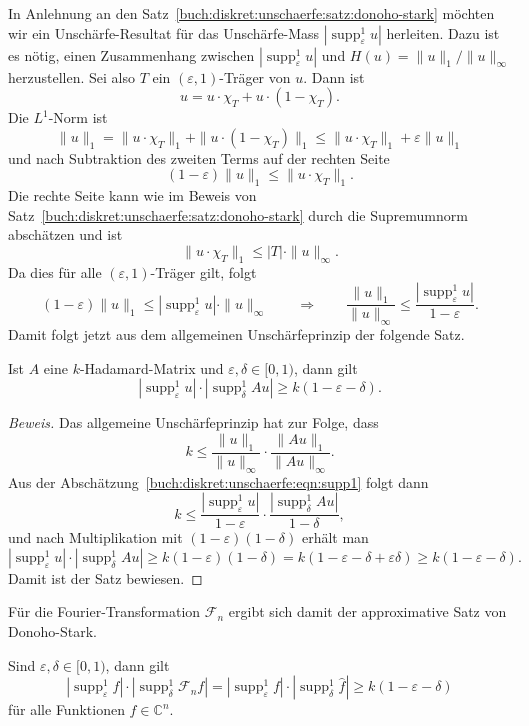 In Anlehnung an den Satz~\ref{buch:diskret:unschaerfe:satz:donoho-stark}
möchten wir ein Unschärfe-Resultat für das Unschärfe-Mass
$|\operatorname{supp}_\varepsilon^1 u|$ herleiten.
Dazu ist es nötig, einen Zusammenhang zwischen
$|\operatorname{supp}_\varepsilon^1 u|$ und $H(u) = \|u\|_1/\|u\|_\infty$ 
herzustellen.
Sei also $T$ ein $(\varepsilon,1)$-Träger von $u$.
Dann ist
\[
u = u\cdot \chi_T + u\cdot (1-\chi_T).
\]
Die $L^1$-Norm ist
\[
\|u\|_1
=
\|u\cdot \chi_T\|_1
+
\|u\cdot (1-\chi_T)\|_1
\le
\|u\cdot \chi_T\|_1
+
\varepsilon \|u\|_1
\]
und nach Subtraktion des zweiten Terms auf der rechten Seite
\[
(1-\varepsilon)\|u\|_1 \le \|u\cdot\chi_T\|_1.
\]
Die rechte Seite kann wie im Beweis von
Satz~\ref{buch:diskret:unschaerfe:satz:donoho-stark}
durch die Supremumnorm abschätzen und ist
\[
\|u\cdot \chi_T\|_1 \le |T| \cdot \|u\|_\infty.
\]
Da dies für alle $(\varepsilon,1)$-Träger gilt, folgt
\begin{equation}
(1-\varepsilon) \|u\|_1
\le
|\operatorname{supp}_\varepsilon^1 u|\cdot \|u\|_\infty
\qquad
\Rightarrow
\qquad
\frac{\|u\|_1}{\|u\|_\infty}
\le
\frac{|\operatorname{supp}_\varepsilon^1 u|}{1-\varepsilon}.
\label{buch:diskret:unschaerfe:eqn:supp1}
\end{equation}
Damit folgt jetzt aus dem allgemeinen Unschärfeprinzip der folgende
Satz.

\begin{satz}
%
Ist $A$ eine $k$-Hadamard-Matrix und $\varepsilon,\delta\in [0,1)$,
dann gilt
\[
|\operatorname{supp}_\varepsilon^1 u|
\cdot
|\operatorname{supp}_\delta^1 Au|
\ge 
k(1-\varepsilon-\delta).
\]
\end{satz}

\begin{proof}[Beweis]
Das allgemeine Unschärfeprinzip hat zur Folge, dass
\[
k
\le
\frac{\|u\|_1}{\|u\|_\infty}
\cdot
\frac{\|Au\|_1}{\|Au\|_\infty}.
\]
Aus der Abschätzung~\eqref{buch:diskret:unschaerfe:eqn:supp1}
folgt dann
\[
k
\le
\frac{ |\operatorname{supp}_\varepsilon^1 u| }{ 1-\varepsilon }
\cdot
\frac{ |\operatorname{supp}_\delta^1 Au| }{ 1-\delta },
\]
und nach Multiplikation mit $(1-\varepsilon)(1-\delta)$ erhält man
\[
|\operatorname{supp}_\varepsilon^1 u|
\cdot
|\operatorname{supp}_\delta^1 Au|
\ge
k(1-\varepsilon)(1-\delta)
=
k(1-\varepsilon-\delta+\varepsilon\delta)
\ge
k(1-\varepsilon-\delta).
\]
Damit ist der Satz bewiesen.
\end{proof}

Für die Fourier-Transformation $\mathscr{F}_n$ ergibt sich damit 
der approximative Satz von Donoho-Stark.

\begin{satz}
Sind $\varepsilon,\delta\in[0,1)$, dann gilt
\[
|\operatorname{supp}_\varepsilon^1 f|
\cdot
|\operatorname{supp}_\delta^1 \mathscr{F}_nf|
=
|\operatorname{supp}_\varepsilon^1 f|
\cdot
|\operatorname{supp}_\delta^1 \hat{f}|
\ge
k(1-\varepsilon-\delta)
\]
für alle Funktionen $f\in\mathbb{C}^n$.
\end{satz}


